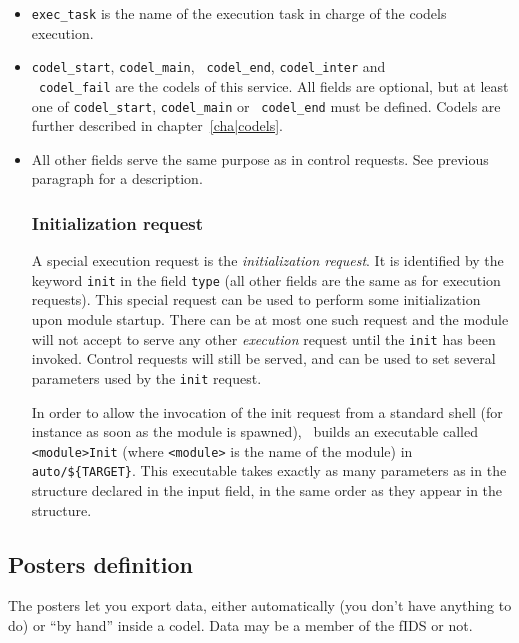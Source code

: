 \begin{itemize}
\item {\tt exec\_task} is the name of the execution task in charge of the
codels execution.

\item {\tt codel\_start}, {\tt codel\_main}, {\tt
codel\_end},     {\tt    codel\_inter}    and \\     {\tt
codel\_fail} are  the  codels of  this  service.  All  fields are
optional,  but at least one  of  {\tt  codel\_start},  {\tt codel\_main} or  {\tt
codel\_end}  must  be   defined.    Codels   are  further described     in
chapter~\ref{cha|codels}.

\item All other fields serve the same purpose  as in control  requests.
See previous paragraph for a description.


\subsubsection{Initialization request}

A special execution request is   the {\em initialization request}. It  is
identified by the keyword {\tt  init} in the  field {\tt type} (all other
fields are the same as for execution requests).  This special request can
be used to perform some initialization upon module  startup. There can be
at  most one such request   and the module will   not accept to serve any
other   {\em    execution}  request until   the   {\tt   init}   has been
invoked.  Control requests will still  be served, and  can be used to set
several parameters used by the {\tt init} request.

In  order to allow the  invocation  of the init  request  from a standard
shell (for instance as soon as the  module is spawned), \GenoM\ builds an
executable called {\tt <module>Init} (where {\tt <module>} is the name of
the module) in {\tt  auto/\$\{TARGET\}}. This executable takes exactly as
many parameters as in the structure  declared in the  input field, in the
same order as they appear in the structure.

\end{itemize}

\subsection{Posters definition}

The  posters let you export   data, either automatically  (you don't have
anything to do) or ``by hand'' inside  a codel.  Data may  be a member of
the fIDS or not.


